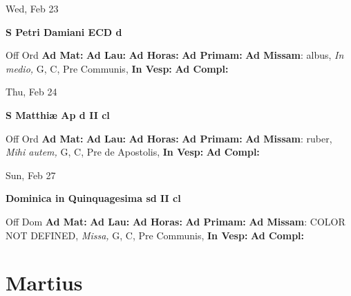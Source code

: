 \documentclass[10pt]{book}
\begin{document}
\begin{center}
\begin{minipage}{3.5in}
\vspace{2em}
\begin{center}Wed, Feb 23
\end{center}
\textbf{ \large S Petri Damiani ECD
\textnormal{\normalsize d}}

\begin{justify}Off Ord
\textbf{Ad Mat: }
\textbf{Ad Lau: }
\textbf{Ad Horas: }
\textbf{Ad Primam: }\textbf{Ad Missam}: albus, \textit{In medio,} G, C, Pre Communis, 
\textbf{In Vesp: }
\textbf{Ad Compl: }
\end{justify}
\end{minipage}
\end{center}

\begin{center}
\begin{minipage}{3.5in}
\vspace{2em}
\begin{center}Thu, Feb 24
\end{center}
\textbf{ \large S Matthiæ Ap
\textnormal{\normalsize d II cl}}

\begin{justify}Off Ord
\textbf{Ad Mat: }
\textbf{Ad Lau: }
\textbf{Ad Horas: }
\textbf{Ad Primam: }\textbf{Ad Missam}: ruber, \textit{Mihi autem,} G, C, Pre de Apostolis, 
\textbf{In Vesp: }
\textbf{Ad Compl: }
\end{justify}
\end{minipage}
\end{center}

\begin{center}
\begin{minipage}{3.5in}
\vspace{2em}
\begin{center}Sun, Feb 27
\end{center}
\textbf{ \large Dominica in Quinquagesima
\textnormal{\normalsize sd II cl}}

\begin{justify}Off Dom
\textbf{Ad Mat: }
\textbf{Ad Lau: }
\textbf{Ad Horas: }
\textbf{Ad Primam: }\textbf{Ad Missam}: COLOR NOT DEFINED, \textit{Missa,} G, C, Pre Communis, 
\textbf{In Vesp: }
\textbf{Ad Compl: }
\end{justify}
\end{minipage}
\end{center}

    \chapter*{Martius}
                    
\end{document}
